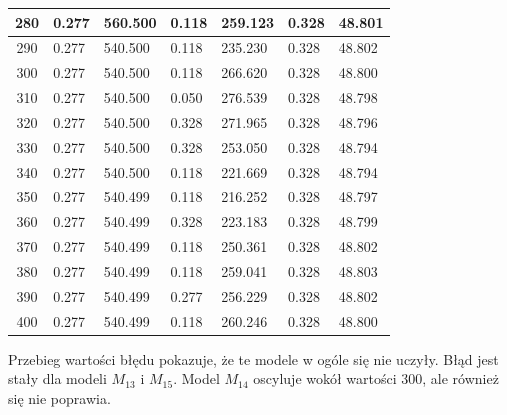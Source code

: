 \documentclass{report}
\begin{document}
\begin{minipage}{\textwidth}
\begin{longtable}{|c|l|l|l|l|l|l|}
                     280 & 0.277 & 560.500 & 0.118 & 259.123 & 0.328 & 48.801 \\ \hline
                     290 & 0.277 & 540.500 & 0.118 & 235.230 & 0.328 & 48.802 \\ \hline
                     300 & 0.277 & 540.500 & 0.118 & 266.620 & 0.328 & 48.800 \\ \hline
                     310 & 0.277 & 540.500 & 0.050 & 276.539 & 0.328 & 48.798 \\ \hline
                     320 & 0.277 & 540.500 & 0.328 & 271.965 & 0.328 & 48.796 \\ \hline
                     330 & 0.277 & 540.500 & 0.328 & 253.050 & 0.328 & 48.794 \\ \hline
                     340 & 0.277 & 540.500 & 0.118 & 221.669 & 0.328 & 48.794 \\ \hline
                     350 & 0.277 & 540.499 & 0.118 & 216.252 & 0.328 & 48.797 \\ \hline
                     360 & 0.277 & 540.499 & 0.328 & 223.183 & 0.328 & 48.799 \\ \hline
                     370 & 0.277 & 540.499 & 0.118 & 250.361 & 0.328 & 48.802 \\ \hline
                     380 & 0.277 & 540.499 & 0.118 & 259.041 & 0.328 & 48.803 \\ \hline
                     390 & 0.277 & 540.499 & 0.277 & 256.229 & 0.328 & 48.802 \\ \hline
                     400 & 0.277 & 540.499 & 0.118 & 260.246 & 0.328 & 48.800 \\ \hline
                 \end{longtable}
    \end{minipage}


    Przebieg wartości błędu pokazuje, że te modele w ogóle się nie uczyły.
    Błąd jest stały dla modeli $M_{13}$ i $M_{15}$.
    Model $M_{14}$ oscyluje wokół wartości 300, ale również się nie poprawia.
\end{document}
